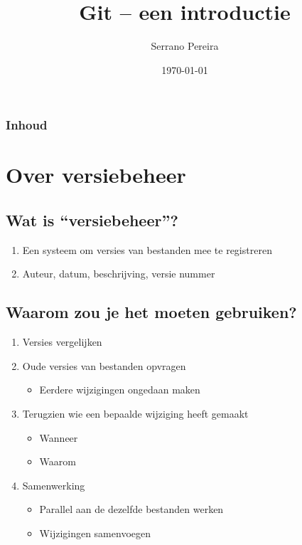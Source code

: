 \documentclass[]{beamer}
\title[Git]
{Git -- een introductie}
\author{Serrano Pereira}
\institute
{
  \inst{}
  Computest, Zoetermeer
}
\date{\today}
\begin{document}
\frame{\titlepage}
\note{}

\begin{frame}
\frametitle{Inhoud}
\tableofcontents
\end{frame}

\section{Over versiebeheer}

\subsection{Wat is ``versiebeheer''?}

\begin{frame}
    \begin{enumerate}
        \item Een systeem om versies van bestanden mee te registreren
        \item Auteur, datum, beschrijving, versie nummer
    \end{enumerate}
\end{frame}

\subsection{Waarom zou je het moeten gebruiken?}

\begin{frame}
    \begin{enumerate}
    \item Versies vergelijken
    \item Oude versies van bestanden opvragen
        \begin{itemize}
            \item Eerdere wijzigingen ongedaan maken
        \end{itemize}
    \item Terugzien wie een bepaalde wijziging heeft gemaakt
        \begin{itemize}
            \item Wanneer
            \item Waarom
        \end{itemize}
    \item Samenwerking
        \begin{itemize}
            \item Parallel aan de dezelfde bestanden werken
            \item Wijzigingen samenvoegen
        \end{itemize}
    \end{enumerate}
\end{frame}
\end{document}
